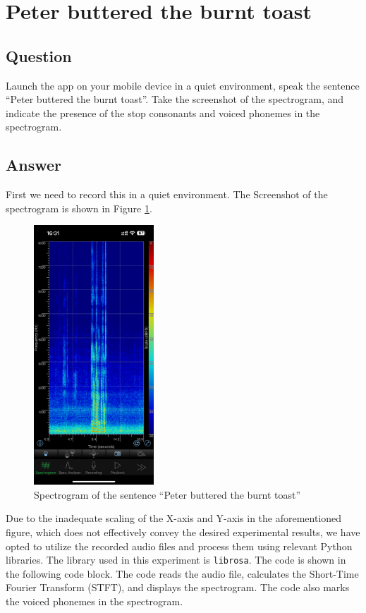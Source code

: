 
\section{Peter buttered the burnt toast}

\subsection{Question}
Launch the app on your mobile device in a quiet environment, speak the sentence ``Peter buttered the burnt toast''. Take the screenshot of the spectrogram, and indicate the presence of the stop consonants and voiced phonemes in the spectrogram.

\subsection{Answer}
First we need to record this in a quiet environment. 
The Screenshot of the spectrogram is shown in Figure \ref{fig:Question1}.
\begin{figure}[H]
    \centering
    \includegraphics[width=0.4\textwidth]{./img/IMG_1831.PNG}
    \caption{Spectrogram of the sentence “Peter buttered the burnt toast”}
    \label{fig:Question1}
\end{figure}


Due to the inadequate scaling of the X-axis and Y-axis in the aforementioned figure, which does not effectively convey the desired experimental results, we have opted to utilize the recorded audio files and process them using relevant Python libraries.
The library used in this experiment is \texttt{librosa}. The code is shown in the following code block. The code reads the audio file, calculates the Short-Time Fourier Transform (STFT), and displays the spectrogram. The code also marks the voiced phonemes in the spectrogram.


